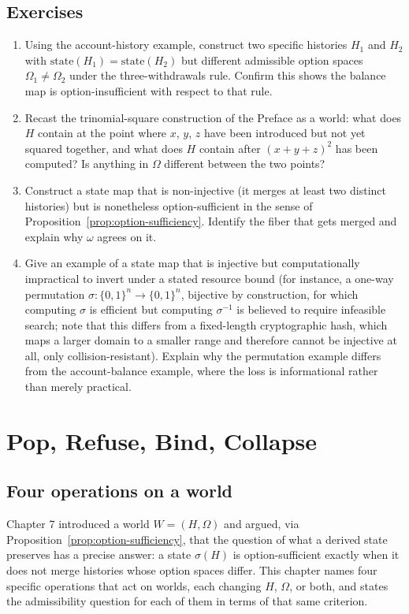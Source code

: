 \documentclass[11pt]{book}
\begin{document}
\section*{Exercises}
\begin{enumerate}
\item Using the account-history example, construct two specific histories $H_1$ and $H_2$ with $\mathrm{state}(H_1)=\mathrm{state}(H_2)$ but different admissible option spaces $\Omega_1\ne\Omega_2$ under the three-withdrawals rule. Confirm this shows the balance map is option-insufficient with respect to that rule.
\item Recast the trinomial-square construction of the Preface as a world: what does $H$ contain at the point where $x$, $y$, $z$ have been introduced but not yet squared together, and what does $H$ contain after $(x+y+z)^2$ has been computed? Is anything in $\Omega$ different between the two points?
\item Construct a state map that is non-injective (it merges at least two distinct histories) but is nonetheless option-sufficient in the sense of Proposition~\ref{prop:option-sufficiency}. Identify the fiber that gets merged and explain why $\omega$ agrees on it.
\item Give an example of a state map that is injective but computationally impractical to invert under a stated resource bound (for instance, a one-way permutation $\sigma:\{0,1\}^n\to\{0,1\}^n$, bijective by construction, for which computing $\sigma$ is efficient but computing $\sigma^{-1}$ is believed to require infeasible search; note that this differs from a fixed-length cryptographic hash, which maps a larger domain to a smaller range and therefore cannot be injective at all, only collision-resistant). Explain why the permutation example differs from the account-balance example, where the loss is informational rather than merely practical.
\end{enumerate}

\chapter{Pop, Refuse, Bind, Collapse}

\section{Four operations on a world}

Chapter 7 introduced a world $W=(H,\Omega)$ and argued, via Proposition~\ref{prop:option-sufficiency}, that the question of what a derived state preserves has a precise answer: a state $\sigma(H)$ is option-sufficient exactly when it does not merge histories whose option spaces differ. This chapter names four specific operations that act on worlds, each changing $H$, $\Omega$, or both, and states the admissibility question for each of them in terms of that same criterion.
\end{document}
